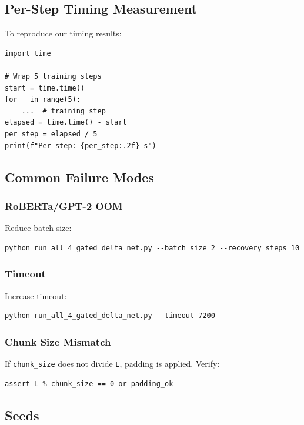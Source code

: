\subsection{Per-Step Timing Measurement}

To reproduce our timing results:

\begin{lstlisting}
import time

# Wrap 5 training steps
start = time.time()
for _ in range(5):
    ...  # training step
elapsed = time.time() - start
per_step = elapsed / 5
print(f"Per-step: {per_step:.2f} s")
\end{lstlisting}

\subsection{Common Failure Modes}

\subsubsection{RoBERTa/GPT-2 OOM}

Reduce batch size:

\begin{lstlisting}
python run_all_4_gated_delta_net.py --batch_size 2 --recovery_steps 10
\end{lstlisting}

\subsubsection{Timeout}

Increase timeout:

\begin{lstlisting}
python run_all_4_gated_delta_net.py --timeout 7200
\end{lstlisting}

\subsubsection{Chunk Size Mismatch}

If \texttt{chunk\_size} does not divide \texttt{L}, padding is applied. Verify:

\begin{lstlisting}
assert L % chunk_size == 0 or padding_ok
\end{lstlisting}

\subsection{Seeds}

